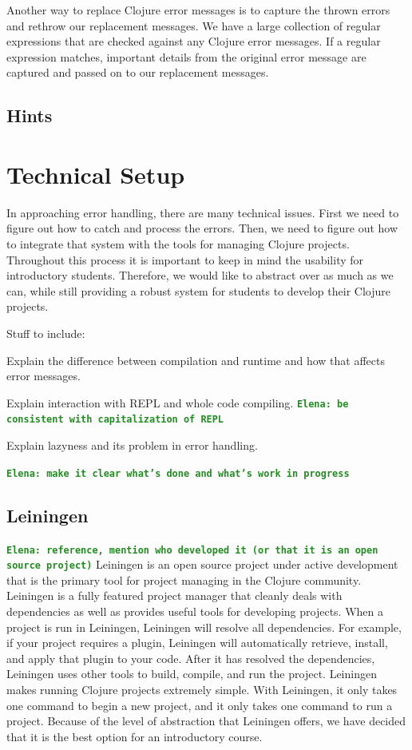 \documentclass[12pt]{article}
\newcommand{\comment}[1]{{\bf \tt  {#1}}}
\newcommand{\emcomment}[1]{\textcolor{ForestGreen}{\comment{Elena: {#1}}}}
\begin{document}
Another way to replace Clojure error messages is to capture the thrown errors and rethrow our replacement messages.
We have a large collection of regular expressions that are checked against any Clojure error messages.
If a regular expression matches, important details from the original error message are captured and passed on to our replacement messages.


\subsection{Hints}\label{sec:hints}
\section{Technical Setup}\label{sec:technical}
In approaching error handling, there are many technical issues. First we need to figure out how to catch and process the errors. Then, we need to figure out how to integrate that system with the tools for managing Clojure projects. Throughout this process it is important to keep in mind the usability for introductory students. Therefore, we would like to abstract over as much as we can, while still providing a robust system for students to develop their Clojure projects.

Stuff to include:

Explain the difference between compilation and runtime and how that affects error messages.

Explain interaction with REPL and whole code compiling. \emcomment{be consistent with capitalization of REPL} 

Explain lazyness and its problem in error handling.

\emcomment{make it clear what's done and what's work in progress}

\subsection{Leiningen}
\emcomment{reference, mention who developed it (or that it is an open source project)}
Leiningen is an open source project under active development that is the primary tool for project managing in the Clojure community\cite{LeinGitHub}. Leiningen is a fully featured project manager that cleanly deals with dependencies as well as provides useful tools for developing projects. When a project is run in Leiningen, Leiningen will resolve all dependencies. For example, if your project requires a plugin, Leiningen will automatically retrieve, install, and apply that plugin to your code. After it has resolved the dependencies, Leiningen uses other tools to build, compile, and run the project. Leiningen makes running Clojure projects extremely simple. With Leiningen, it only takes one command to begin a new project, and it only takes one command to run a project. Because of the level of abstraction that Leiningen offers, we have decided that it is the best option for an introductory course.
\end{document}
